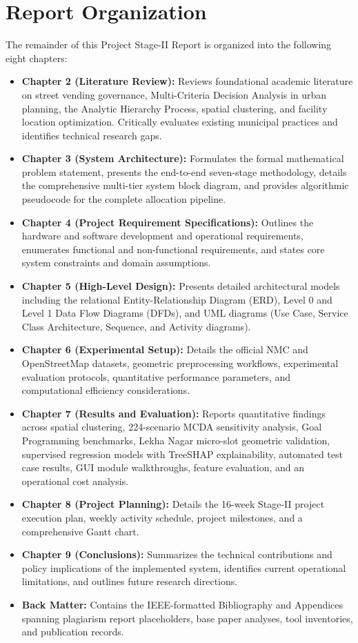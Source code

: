 \section{Report Organization}
\label{sec:report_organization}

The remainder of this Project Stage-II Report is organized into the following eight chapters:

\begin{itemize}
    \item \textbf{Chapter 2 (Literature Review):} Reviews foundational academic literature on street vending governance, Multi-Criteria Decision Analysis in urban planning, the Analytic Hierarchy Process, spatial clustering, and facility location optimization. Critically evaluates existing municipal practices and identifies technical research gaps.
    \item \textbf{Chapter 3 (System Architecture):} Formulates the formal mathematical problem statement, presents the end-to-end seven-stage methodology, details the comprehensive multi-tier system block diagram, and provides algorithmic pseudocode for the complete allocation pipeline.
    \item \textbf{Chapter 4 (Project Requirement Specifications):} Outlines the hardware and software development and operational requirements, enumerates functional and non-functional requirements, and states core system constraints and domain assumptions.
    \item \textbf{Chapter 5 (High-Level Design):} Presents detailed architectural models including the relational Entity-Relationship Diagram (ERD), Level 0 and Level 1 Data Flow Diagrams (DFDs), and UML diagrams (Use Case, Service Class Architecture, Sequence, and Activity diagrams).
    \item \textbf{Chapter 6 (Experimental Setup):} Details the official NMC and OpenStreetMap datasets, geometric preprocessing workflows, experimental evaluation protocols, quantitative performance parameters, and computational efficiency considerations.
    \item \textbf{Chapter 7 (Results and Evaluation):} Reports quantitative findings across spatial clustering, 224-scenario MCDA sensitivity analysis, Goal Programming benchmarks, Lekha Nagar micro-slot geometric validation, supervised regression models with TreeSHAP explainability, automated test case results, GUI module walkthroughs, feature evaluation, and an operational cost analysis.
    \item \textbf{Chapter 8 (Project Planning):} Details the 16-week Stage-II project execution plan, weekly activity schedule, project milestones, and a comprehensive Gantt chart.
    \item \textbf{Chapter 9 (Conclusions):} Summarizes the technical contributions and policy implications of the implemented system, identifies current operational limitations, and outlines future research directions.
    \item \textbf{Back Matter:} Contains the IEEE-formatted Bibliography and Appendices spanning plagiarism report placeholders, base paper analyses, tool inventories, and publication records.
\end{itemize}
